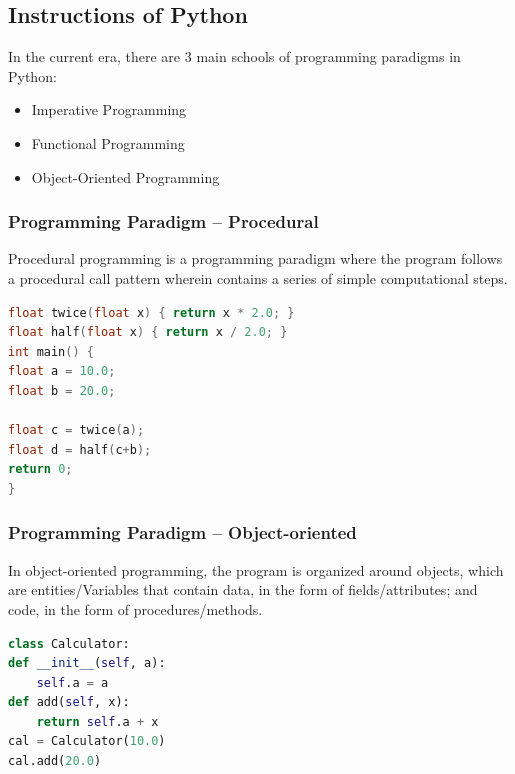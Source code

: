 \documentclass{beamer}
\begin{document}
    \subsection{Instructions of Python}
    \begin{frame}[fragile]
        In the current era, there are 3 main schools of programming paradigms in Python:
        \begin{itemize}
            \item Imperative Programming
            \item Functional Programming
            \item Object-Oriented Programming
        \end{itemize}
    \end{frame}

    \begin{frame}[fragile]
        \frametitle{Programming Paradigm -- Procedural}
        Procedural programming is a programming paradigm where the program follows a procedural call pattern wherein contains a series of simple computational steps.
        \begin{example}
            \begin{lstlisting}[language=C++]
float twice(float x) { return x * 2.0; }
float half(float x) { return x / 2.0; }
int main() {
float a = 10.0;
float b = 20.0;

float c = twice(a);
float d = half(c+b);
return 0;
}
            \end{lstlisting}
        \end{example}
    \end{frame}

    \begin{frame}[fragile]
        \frametitle{Programming Paradigm -- Object-oriented}
        In object-oriented programming, the program is organized around objects, which are entities/Variables that contain data, in the form of fields/attributes; and code, in the form of procedures/methods.
        \begin{example}
            \begin{lstlisting}[language=Python]
class Calculator:
def __init__(self, a):
    self.a = a
def add(self, x):
    return self.a + x
cal = Calculator(10.0)
cal.add(20.0)
            \end{lstlisting}
        \end{example}
    \end{frame}
\end{document}
